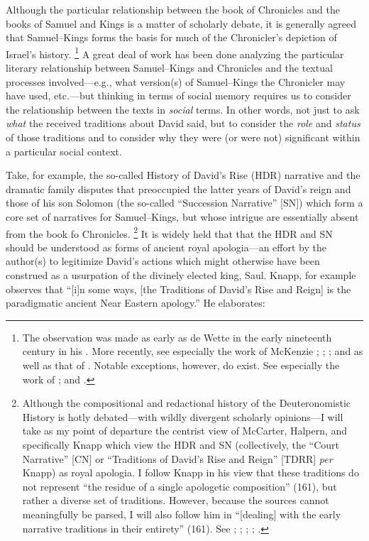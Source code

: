 Although the particular relationship between the book of Chronicles and the books of Samuel and Kings is a matter of scholarly debate, it is generally agreed that Samuel--Kings forms the basis for much of the Chronicler's depiction of Israel's history.%
    \footnote{The observation was made as early as de Wette in the early nineteenth century in his \cite*{dewette1806}. More recently, see especially the work of McKenzie
        \cite*{mckenzie1985};
        \cite{mckenzie_graham-mckenzie1999};
        \cite[66--71]{knoppers2003}; and 
        \cite[30--42]{klein2006} as well as that of 
        \cite[74--74]{carr2011}. Notable exceptions, however, do exist. See especially the work of 
        \cite{auld1994}; 
        \cite{auld_graham-mckenzie1999} and 
        \cite{person2010}.}
A great deal of work has been done analyzing the particular literary relationship between Samuel--Kings and Chronicles and the textual processes involved---e.g., what version(s) of Samuel--Kings the Chronicler may have used, etc.---but thinking in terms of social memory requires us to consider the relationship between the texts in \emph{social} terms. In other words, not just to ask \emph{what} the received traditions about David said, but to consider the \emph{role} and \emph{status} of those traditions and to consider why they were (or were not) significant within a particular social context.

Take, for example, the so-called History of David's Rise (HDR) narrative  and the dramatic family disputes that preoccupied the latter years of David's reign and those of his son Solomon (the so-called ``Succession Narrative'' [SN]) which form a core set of narratives for Samuel--Kings, but whose intrigue are essentially absent from the book fo Chronicles.%
    \footnote{Although the compositional and redactional history of the Deuteronomistic History is hotly debated---with wildly divergent scholarly opinions---I will take as my point of departure the centrist view of McCarter, Halpern, and specifically Knapp which view the HDR and SN (collectively, the ``Court Narrative'' [CN] or ``Traditions of David's Rise and Reign'' [TDRR] \emph{per} Knapp) as royal apologia. I follow Knapp in his view that these traditions do not represent ``the residue of a single apologetic composition'' (161), but rather a diverse set of traditions. However, because the sources cannot meaningfully be parsed, I will also follow him in ``[dealing] with the early narrative traditions in their entirety'' (161). See 
        \cite{knapp2015};
        \cite{mccarter_interpretation1981};
        \cite{mccarter_jbl1980};
        \cite{mccarter1980};
        \cite{halpern2001}.}
It is widely held that that the HDR and SN should be understood as forms of ancient royal apologia---an effort by the author(s) to legitimize David's actions which might otherwise have been construed as a usurpation of the divinely elected king, Saul. Knapp, for example observes that ``[i]n some ways, [the Traditions of David's Rise and Reign] is the paradigmatic ancient Near Eastern apology.''%
    \autocite[218]{knapp2015}
He elaborates:

